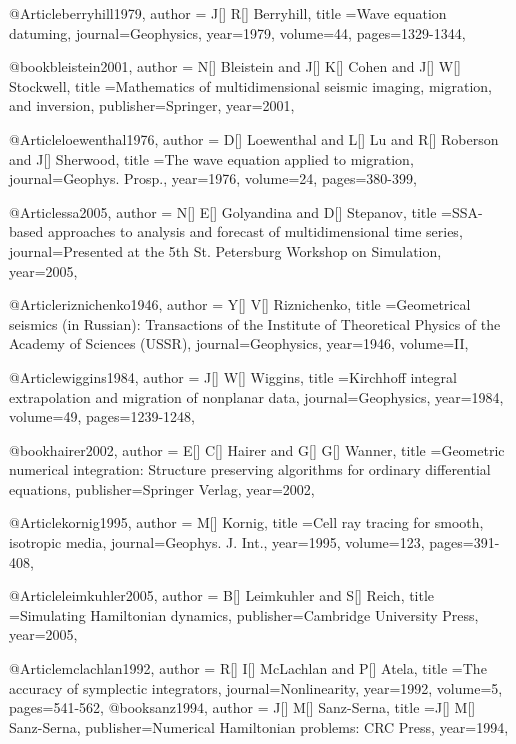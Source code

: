 @Article{berryhill1979,
  author = {J[] R[] Berryhill},
  title ={Wave equation datuming},
  journal={Geophysics},
  year=1979,
  volume=44,
  pages={1329-1344},
}

@book{bleistein2001,
  author = {N[] Bleistein and J[] K[] Cohen and J[] W[] Stockwell},
  title ={Mathematics of multidimensional seismic imaging, migration, and inversion},
  publisher={Springer},
  year=2001,
}

@Article{loewenthal1976,
  author = {D[] Loewenthal and L[] Lu and R[] Roberson and J[] Sherwood},
  title ={The wave equation applied to migration},
  journal={Geophys. Prosp.},
  year=1976,
  volume=24,
  pages={380-399},
}

@Article{ssa2005,
  author = {N[] E[] Golyandina and D[] Stepanov},
  title ={SSA-based approaches to analysis and forecast of multidimensional time series},
  journal={Presented at the 5th St. Petersburg Workshop on Simulation},
  year=2005,
}



@Article{riznichenko1946,
  author = {Y[] V[] Riznichenko},
  title ={Geometrical seismics (in Russian): Transactions of the Institute of Theoretical Physics of the Academy of Sciences (USSR)},
  journal={Geophysics},
  year=1946,
  volume=II,
}

@Article{wiggins1984,
  author = {J[] W[] Wiggins},
  title ={Kirchhoff integral extrapolation and migration of nonplanar data},
  journal={Geophysics},
  year=1984,
  volume=49,
  pages={1239-1248},
}

@book{hairer2002,
  author = {E[] C[] Hairer and G[] G[] Wanner},
  title ={Geometric numerical integration: Structure preserving algorithms for ordinary differential equations},
  publisher={Springer Verlag},
  year=2002,
}

@Article{kornig1995,
  author = {M[] Kornig},
  title ={Cell ray tracing for smooth, isotropic media},
  journal={Geophys. J. Int.},
  year=1995,
  volume=123,
  pages={391-408},
}

@Article{leimkuhler2005,
  author = {B[] Leimkuhler and S[] Reich},
  title ={Simulating Hamiltonian dynamics},
  publisher={Cambridge University Press},
  year=2005,
}


@Article{mclachlan1992,
  author = {R[] I[] McLachlan and P[] Atela},
  title ={The accuracy of symplectic integrators},
  journal={Nonlinearity},
  year=1992,
  volume=5,
  pages={541-562},
}
@book{sanz1994,
  author = {J[] M[] Sanz-Serna},
  title ={J[] M[] Sanz-Serna},
  publisher={Numerical Hamiltonian problems: CRC Press},
  year=1994,
}

